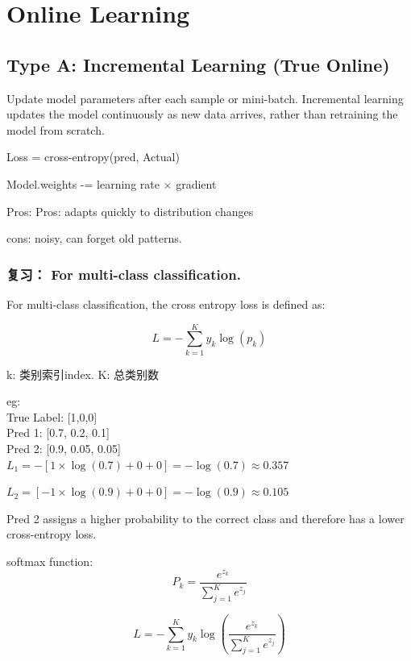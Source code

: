 \section{Online Learning}
\subsection{Type A: Incremental Learning (True Online)}
Update model parameters after each sample or mini-batch.
Incremental learning updates the model continuously as new data arrives, rather than retraining the model from scratch.

Loss = cross-entropy(pred, Actual)

Model.weights -= learning rate $\times$ gradient

Pros: Pros: adapts quickly to distribution changes

cons: noisy,  can forget old patterns.

\subsubsection{复习： For multi-class classification.}


For multi-class classification, the cross entropy loss is defined as:

\begin{equation}
    L=-\sum_{k=1}^{K}y_k\log(p_k)
\end{equation}

k: 类别索引index. K: 总类别数

eg:\\
True Label: [1,0,0]\\
Pred 1: [0.7, 0.2, 0.1]\\
Pred 2: [0.9, 0.05, 0.05]\\

$L_1 = -[1 \times \log(0.7) + 0 + 0] = -\log(0.7) \approx 0.357$

$L_2 = [-1 \times \log(0.9) + 0 + 0] = -\log(0.9) \approx 0.105$

Pred 2 assigns a higher probability to the correct class and therefore has a lower cross-entropy loss.



softmax function: 
\begin{equation}
    P_k = \frac{e^{z_k}}{\sum_{j = 1}^{K} e^{z_j}} 
\end{equation}

\begin{equation}
    L = -\sum_{k = 1}^{K} y_k \log(\frac{e^{z_k}}{\sum_{j = 1}^{K} e^{z_j}} )
\end{equation}


